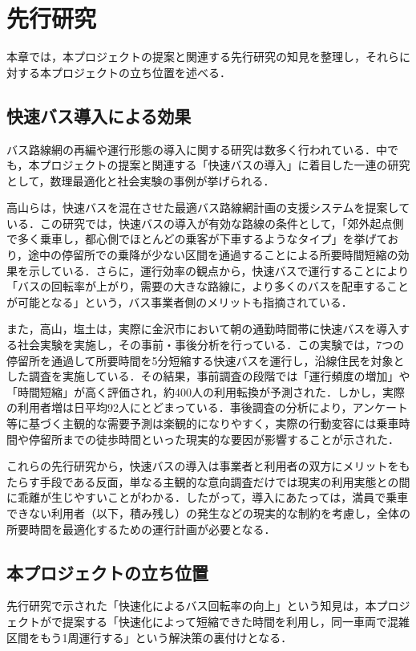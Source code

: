 \chapter{先行研究}
本章では，本プロジェクトの提案と関連する先行研究の知見を整理し，それらに対する本プロジェクトの立ち位置を述べる．
\section{快速バス導入による効果}
バス路線網の再編や運行形態の導入に関する研究は数多く行われている．中でも，本プロジェクトの提案と関連する「快速バスの導入」に着目した一連の研究\cite{ref:takayama1998,ref:takayama1996}として，数理最適化と社会実験の事例が挙げられる．

高山ら\cite{ref:takayama1998}は，快速バスを混在させた最適バス路線網計画の支援システムを提案している．この研究では，快速バスの導入が有効な路線の条件として，「郊外起点側で多く乗車し，都心側でほとんどの乗客が下車するようなタイプ」を挙げており，途中の停留所での乗降が少ない区間を通過することによる所要時間短縮の効果を示している．さらに，運行効率の観点から，快速バスで運行することにより「バスの回転率が上がり，需要の大きな路線に，より多くのバスを配車することが可能となる」という，バス事業者側のメリットも指摘されている．

また，高山，塩土\cite{ref:takayama1996}は，実際に金沢市において朝の通勤時間帯に快速バスを導入する社会実験を実施し，その事前・事後分析を行っている．この実験では，7つの停留所を通過して所要時間を5分短縮する快速バスを運行し，沿線住民を対象とした調査を実施している．その結果，事前調査の段階では「運行頻度の増加」や「時間短縮」が高く評価され，約400人の利用転換が予測された．しかし，実際の利用者増は日平均92人にとどまっている．事後調査の分析により，アンケート等に基づく主観的な需要予測は楽観的になりやすく，実際の行動変容には乗車時間や停留所までの徒歩時間といった現実的な要因が影響することが示された．

これらの先行研究から，快速バスの導入は事業者と利用者の双方にメリットをもたらす手段である反面，単なる主観的な意向調査だけでは現実の利用実態との間に乖離が生じやすいことがわかる．したがって，導入にあたっては，満員で乗車できない利用者（以下，積み残し）の発生などの現実的な制約を考慮し，全体の所要時間を最適化するための運行計画が必要となる．


\section{本プロジェクトの立ち位置}
先行研究で示された「快速化によるバス回転率の向上」という知見は，本プロジェクトがで提案する「快速化によって短縮できた時間を利用し，同一車両で混雑区間をもう1周運行する」という解決策の裏付けとなる．

